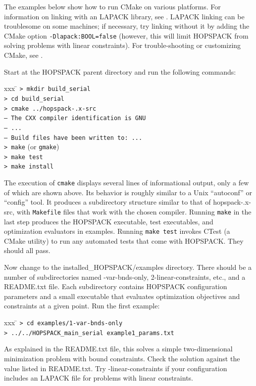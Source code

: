 The examples below show how to run CMake on various platforms.
For information on linking with an LAPACK library, see .
LAPACK linking can be troublesome on some machines; if necessary, try linking
without it by adding the CMake option {\tt -Dlapack:BOOL=false} (however,
this will limit HOPSPACK from solving problems with linear constraints).
For trouble-shooting or customizing CMake, see .


\bigskip
{}
Start at the HOPSPACK parent directory and run the following commands:
\vspace{-11pt}
\begin{tabbing}
  xxx \= \kill
  \> {\tt > mkdir build\_serial} \\
  \> {\tt > cd build\_serial} \\
  \> {\tt > cmake ../hopspack-\HOPSVER.x-src} \\
  \> {\tt -- The CXX compiler identification is GNU} \\
  \> {\tt -- ...} \\
  \> {\tt -- Build files have been written to: ...} \\
  \> {\tt > make} (or {\tt gmake}) \\
  \> {\tt > make test} \\
  \> {\tt > make install}
\end{tabbing}
\vspace{-11pt}
The execution of {\tt cmake} displays several lines of informational output,
only a few of which are shown above.  Its behavior is roughly similar to a
Unix ``autoconf'' or ``config'' tool.
It produces a subdirectory structure similar to that of
{\sf hopspack-\HOPSVER.x-src},
with {\tt Makefile} files that work with the chosen compiler.  Running
{\tt make} in the last step produces the HOPSPACK executable, test executables,
and optimization evaluators in {\sf examples}.
Running {\tt make test} invokes CTest (a CMake utility) to run any automated
tests that come with HOPSPACK.  They should all pass.

Now change to the {\sf installed\_HOPSPACK/examples} directory.
There should be a number of
subdirectories named {-var-bnds-only, 2-linear-constraints}, etc.,
and a {\sf README.txt} file.  Each subdirectory contains HOPSPACK
configuration parameters and a small executable that evaluates optimization
objectives and constraints at a given point.
Run the first example:
\vspace{-11pt}
\begin{tabbing}
  xxx \= \kill
  \> {\tt > cd examples/1-var-bnds-only} \\
  \> {\tt > ../../HOPSPACK\_main\_serial example1\_params.txt}
\end{tabbing}
\vspace{-11pt}
As explained in the {\sf README.txt} file, this solves a simple two-dimensional
minimization problem with bound constraints.  Check the solution against
the value listed in {\sf README.txt}.
Try {-linear-constraints} if your configuration includes an LAPACK file
for problems with linear constraints.

